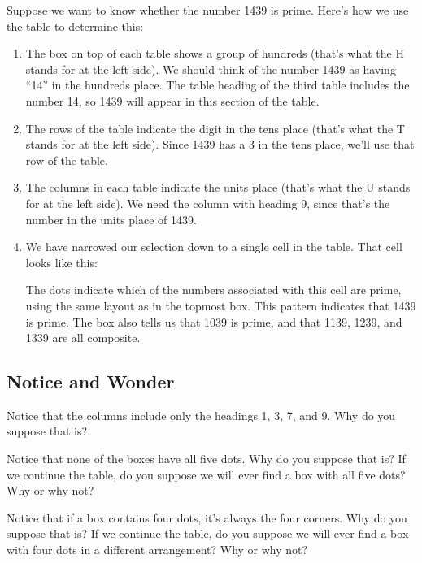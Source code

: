Suppose we want to know whether the number 1439 is prime. Here's how we use the table to determine this:
\begin{enumerate}
\item The box on top of each table shows a group of hundreds (that's what the H stands for at the left side). We should think of the number 1439 as having ``14'' in the hundreds place. The table heading of the third table includes the number 14, so 1439 will appear in this section of the table.

\item The rows of the table indicate the digit in the tens place (that's what the T stands for at the left side). Since 1439 has a 3 in the tens place, we'll use that row of the table.

\item The columns in each table indicate the units place (that's what the U stands for at the left side). We need the column with heading 9, since that's the number in the units place of 1439.

\item We have narrowed our selection down to a single cell in the table. That cell looks like this:
\begin{center}\end{center}
The dots indicate which of the numbers associated with this cell are prime, using the same layout as in the topmost box. This pattern indicates that 1439 is prime. The box also tells us that 1039 is prime, and that 1139, 1239, and 1339 are all composite.
\end{enumerate}

\subsection*{Notice and Wonder}

Notice that the columns include only the headings 1, 3, 7, and 9. Why do you suppose that is?

Notice that none of the boxes have all five dots. Why do you suppose that is? If we continue the table, do you suppose we will ever find a box with all five dots? Why or why not?

Notice that if a box contains four dots, it's always the four corners. Why do you suppose that is? If we continue the table, do you suppose we will ever find a box with four dots in a different arrangement? Why or why not?


